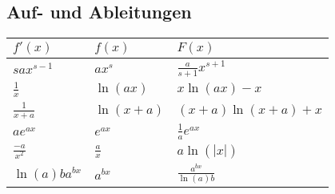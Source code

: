 \subsection{Auf- und Ableitungen}
\begin{tabular}{l | l | l}
    $f'(x)$ & $f(x)$ & $F(x)$\\
    \hline
    $sax^{s-1}$                                                       & $ax^s$                  & $\frac{a}{s + 1}x^{s + 1}$\\
    $\frac{1}{x}$                                                     & $\ln(ax)$               & $x \ln(ax) - x$\\
    $\frac{1}{x + a}$                                                 & $\ln(x + a)$            & $(x + a) \ln(x + a) + x$\\
    $ae^{ax}$                                                         & $e^{ax}$                & $\frac{1}{a} e^{ax}$\\
    $\frac{-a}{x^2}$                                                  & $\frac{a}{x}$           & $a\ln(|x|)$\\
    $\ln(a)b a^{b x}$                                                 & $a^{bx}$                & $\frac{a^{bx}}{\ln(a)b}$\\
\end{tabular}

